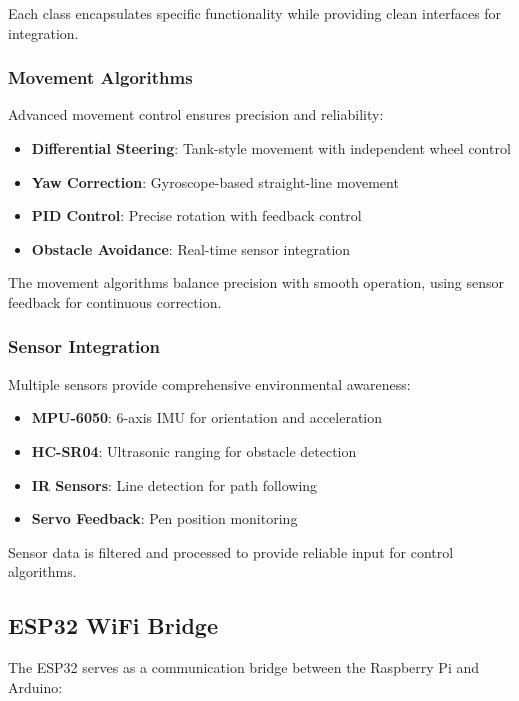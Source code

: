 Each class encapsulates specific functionality while providing clean interfaces for integration.

\subsubsection{Movement Algorithms}

Advanced movement control ensures precision and reliability:

\begin{itemize}
    \item \textbf{Differential Steering}: Tank-style movement with independent wheel control
    \item \textbf{Yaw Correction}: Gyroscope-based straight-line movement
    \item \textbf{PID Control}: Precise rotation with feedback control
    \item \textbf{Obstacle Avoidance}: Real-time sensor integration
\end{itemize}

The movement algorithms balance precision with smooth operation, using sensor feedback for continuous correction.

\subsubsection{Sensor Integration}

Multiple sensors provide comprehensive environmental awareness:

\begin{itemize}
    \item \textbf{MPU-6050}: 6-axis IMU for orientation and acceleration
    \item \textbf{HC-SR04}: Ultrasonic ranging for obstacle detection
    \item \textbf{IR Sensors}: Line detection for path following
    \item \textbf{Servo Feedback}: Pen position monitoring
\end{itemize}

Sensor data is filtered and processed to provide reliable input for control algorithms.

\subsection{ESP32 WiFi Bridge}

The ESP32 serves as a communication bridge between the Raspberry Pi and Arduino:

